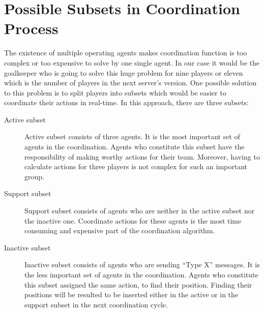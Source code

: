 \section{Possible Subsets in Coordination Process}
The existence of multiple operating agents makes coordination function is too complex or too expensive to solve by one single agent. In our case it would be the goalkeeper who is going to solve this huge problem for nine players or eleven which is the number of players in the next server's version. One possible solution to this problem is to split players into subsets which would be easier to coordinate their actions in real-time. In this approach, there are three subsets:
\begin{description}
\item[Active subset] Active subset consists of three agents. It is the most important set of agents in the coordination. Agents who constitute this subset have the responsibility of making worthy actions for their team. Moreover, having to calculate actions for three players is not complex for such an important group. 

\item[Support subset] Support subset consists of agents who are neither in the active subset nor the inactive one. Coordinate actions for these agents is the most time consuming and expensive part of the coordination algorithm.

\item[Inactive subset]Inactive subset consists of agents who are sending ``Type X'' messages. It is the less important set of agents in the coordination. Agents who constitute this subset assigned the same action, to find their position. Finding their positions will be resulted to be inserted either in the active or in the support subset in the next coordination cycle.
\end{description}

